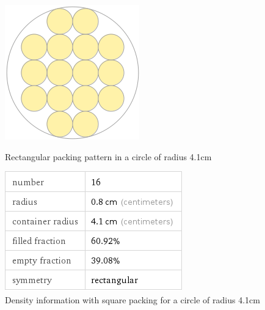 \begin{figure}[ht!]
\centering

    \begin{minipage}{0.4\textwidth}
    \centering
    \includegraphics[width= \textwidth]{Figures/Packing/SquarePacking_r0.8_R4.1.png}
    \caption{Rectangular packing pattern in a circle of radius 4.1cm}
    \label{fig:square4.1}
    \end{minipage}\hfill
    \begin{minipage}{0.4\textwidth}
    \centering
    \includegraphics[width= \textwidth]{Figures/Packing/SquarePacking_r0.8_R4.1_packingPercent.png}
    \caption{Density information with square packing for a circle of radius 4.1cm}
    \label{fig:squaret4.1_packinginfo}
    \end{minipage}
    
\end{figure}

